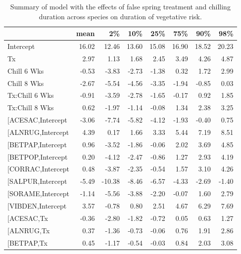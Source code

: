 \documentclass{article}\usepackage[]{graphicx}\usepackage[]{color}
\makeatletter
\newenvironment{kframe}{%
 \def\at@end@of@kframe{}%
 \ifinner\ifhmode%
  \def\at@end@of@kframe{\end{minipage}}%
  \begin{minipage}{\columnwidth}%
 \fi\fi%
 \def\FrameCommand##1{\hskip\@totalleftmargin \hskip-\fboxsep
 \colorbox{shadecolor}{##1}\hskip-\fboxsep
     \hskip-\linewidth \hskip-\@totalleftmargin \hskip\columnwidth}%
 \MakeFramed {\advance\hsize-\width
   \@totalleftmargin\z@ \linewidth\hsize
   \@setminipage}}%
 {\par\unskip\endMakeFramed%
 \at@end@of@kframe}
\makeatother
\begin{document}
\begin{kframe}


{\ttfamily\noindent\bfseries\color{errorcolor}{\#\# Error in gsub("{}["{}, "{}"{}, modoutput\$term): invalid regular expression '[', reason 'Missing ']''}}\end{kframe}%
\begin{longtable}{lrrrrrrr}
\caption{Summary of model with the effects of false spring treatment and chilling duration across species on duration of vegetative risk.} \\ 
  \hline
 & mean & 2\% & 10\% & 25\% & 75\% & 90\% & 98\% \\ 
  \hline \endhead  \hline
Intercept & 16.02 & 12.46 & 13.60 & 15.08 & 16.90 & 18.52 & 20.23 \\ 
  Tx & 2.97 & 1.13 & 1.68 & 2.45 & 3.49 & 4.26 & 4.87 \\ 
  Chill 6 Wks & -0.53 & -3.83 & -2.73 & -1.38 & 0.32 & 1.72 & 2.99 \\ 
  Chill 8 Wks & -2.67 & -5.54 & -4.56 & -3.35 & -1.94 & -0.85 & 0.03 \\ 
  Tx:Chill 6 Wks & -0.91 & -3.59 & -2.78 & -1.65 & -0.17 & 0.92 & 1.85 \\ 
  Tx:Chill 8 Wks & 0.62 & -1.97 & -1.14 & -0.08 & 1.34 & 2.38 & 3.25 \\ 
  [ACESAC,Intercept & -3.06 & -7.74 & -5.82 & -4.12 & -1.93 & -0.40 & 0.75 \\ 
  [ALNRUG,Intercept & 4.39 & 0.17 & 1.66 & 3.33 & 5.44 & 7.19 & 8.51 \\ 
  [BETPAP,Intercept & 0.96 & -3.52 & -1.86 & -0.06 & 2.02 & 3.69 & 4.85 \\ 
  [BETPOP,Intercept & 0.20 & -4.12 & -2.47 & -0.86 & 1.27 & 2.93 & 4.19 \\ 
  [CORRAC,Intercept & 0.48 & -3.87 & -2.35 & -0.54 & 1.57 & 3.10 & 4.26 \\ 
  [SALPUR,Intercept & -5.49 & -10.38 & -8.46 & -6.57 & -4.33 & -2.69 & -1.40 \\ 
  [SORAME,Intercept & -1.14 & -5.56 & -3.88 & -2.20 & -0.07 & 1.60 & 2.79 \\ 
  [VIBDEN,Intercept & 3.57 & -0.78 & 0.80 & 2.51 & 4.67 & 6.29 & 7.69 \\ 
  [ACESAC,Tx & -0.36 & -2.80 & -1.82 & -0.72 & 0.05 & 0.63 & 1.27 \\ 
  [ALNRUG,Tx & 0.37 & -1.36 & -0.73 & -0.06 & 0.76 & 1.91 & 2.86 \\ 
  [BETPAP,Tx & 0.45 & -1.17 & -0.54 & -0.03 & 0.84 & 2.03 & 3.08 \\ 

\end{longtable}
\end{document}
